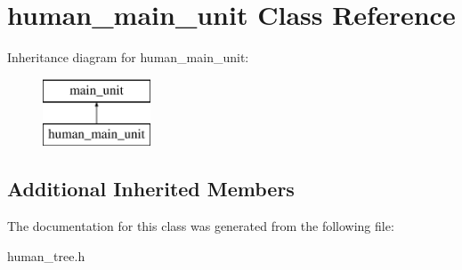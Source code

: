 \hypertarget{classhuman__main__unit}{}\section{human\+\_\+main\+\_\+unit Class Reference}
\label{classhuman__main__unit}
Inheritance diagram for human\+\_\+main\+\_\+unit\+:\begin{figure}[H]
\begin{center}
\leavevmode
\includegraphics[height=2.000000cm]{classhuman__main__unit}
\end{center}
\end{figure}
\subsection*{Additional Inherited Members}


The documentation for this class was generated from the following file\+:\begin{DoxyCompactItemize}
\item 
human\+\_\+tree.\+h\end{DoxyCompactItemize}
